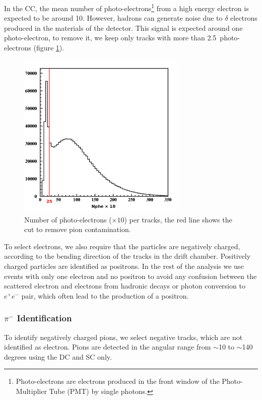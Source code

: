 In the CC, the mean number of photo-electrons\footnote{Photo-electrons are 
electrons produced in the front window of the Photo-Multiplier Tube (PMT) by 
single photons.} from a high energy electron is expected to be around 10.
However, hadrons can generate noise due to $\delta$ electrons produced in 
the materials of the detector. This signal is expected around 
one photo-electron, to remove it, we keep only tracks with more than 
2.5~photo-electrons (figure \ref{delta}). 

\begin{figure}[tbp]
\centering
\includegraphics[width=8cm] {chap5-fig/fig04.png} 
\caption {Number of photo-electrons ($\times 10$) per tracks, the red line 
shows the cut to remove pion contamination.}
\label{delta}
\end{figure}

To select electrons, we also require that the particles are negatively charged, 
according to the bending direction of the tracks in the drift chamber.
Positively charged particles are identified as positrons. In the rest of the 
analysis we use events with only one electron and no positron to avoid any 
confusion between the scattered electron and electrons from hadronic decays or 
photon conversion to $e^+e^-$ pair, which often lead to the production of a
positron.

\subsubsection{$\pi^-$ Identification}
\label{PiId}

To identify negatively charged pions, we select negative tracks, which are not 
identified as electron. Pions are detected in the angular range from $\sim$10 to 
$\sim$140 degrees using the DC and SC only.


